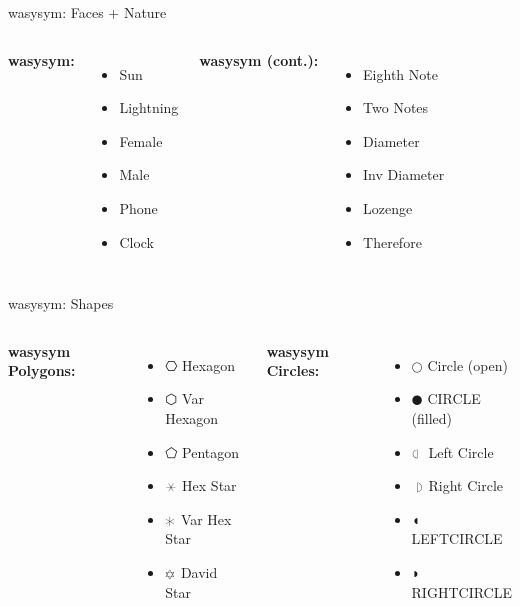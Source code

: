 \documentclass[10pt]{beamer}
\begin{document}
\begin{frame}{wasysym: Faces + Nature}
\begin{columns}
\textbf{wasysym:}
\begin{itemize}
  \item \sun Sun
  \item \lightning Lightning
  \item \female Female
  \item \male Male
  \item \phone Phone
  \item \clock Clock
\end{itemize}

\textbf{wasysym (cont.):}
\begin{itemize}
  \item \eighthnote Eighth Note
  \item \twonotes Two Notes
  \item \diameter Diameter
  \item \invdiameter Inv Diameter
  \item \wasylozenge Lozenge
  \item \wasytherefore Therefore
\end{itemize}
\end{columns}
\end{frame}

\begin{frame}{wasysym: Shapes}
\begin{columns}
\textbf{wasysym Polygons:}
\begin{itemize}
  \item $\hexagon$ Hexagon
  \item $\varhexagon$ Var Hexagon
  \item $\pentagon$ Pentagon
  \item $\hexstar$ Hex Star
  \item $\varhexstar$ Var Hex Star
  \item $\davidsstar$ David Star
\end{itemize}

\textbf{wasysym Circles:}
\begin{itemize}
  \item $\Circle$ Circle (open)
  \item $\CIRCLE$ CIRCLE (filled)
  \item $\Leftcircle$ Left Circle
  \item $\Rightcircle$ Right Circle
  \item $\LEFTCIRCLE$ LEFTCIRCLE
  \item $\RIGHTCIRCLE$ RIGHTCIRCLE
\end{itemize}
\end{columns}
\end{frame}
\end{document}
